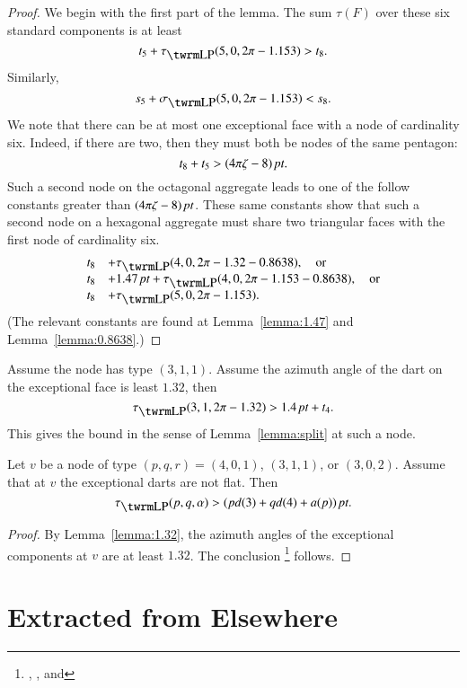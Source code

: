 \begin{proof}
We begin with the first part of the lemma. The sum  $\tau(F)$ over
these six standard components is at least
    $$t_5+\tauLP(5,0,2\pi-1.153)> t_8.$$
Similarly,
    $$s_5+\sLP(5,0,2\pi-1.153)<s_8.$$
%
We note that there can be at most one exceptional face with a node
of cardinality six.  Indeed, if there are two, then they must both
be nodes of the same pentagon:
    $$t_8+t_5>(4\pi\zeta-8)\,\hbox{\it pt}.$$
Such a second node on the octagonal aggregate leads to one of the
follow constants greater than $(4\pi\zeta-8)\,\hbox{\it pt}$.  These same constants
show that such a second node on a hexagonal aggregate must share two
triangular faces with the first node of cardinality six.
$$\begin{array}{lll}
    t_8 &+\tauLP(4,0,2\pi-1.32-0.8638),\quad\text{or}\\
    t_8 &+1.47\,\pt+\tauLP(4,0,2\pi-1.153-0.8638),\quad\text{or}\\
    t_8 &+\tauLP(5,0,2\pi-1.153) .
\end{array}
$$
(The relevant constants are found at Lemma~\ref{lemma:1.47} and
Lemma~\ref{lemma:0.8638}.)
\end{proof}

\begin{lemma}\label{a:311}  %
Assume the node has type $(3,1,1)$.
 Assume the azimuth angle of the dart on the exceptional face is
least $1.32$, then
    \begin{equation}
    \tauLP(3,1,2\pi-1.32)>1.4\,\pt + t_4.
    \label{eqn:tau1.32}
    \end{equation}
This gives the bound in the sense of Lemma~\ref{lemma:split} at such
a node. 
\end{lemma}

\begin{lemma}\label{a:no-ef}  Let $v$ be a node of type
$(p,q,r)=(4,0,1)$, $(3,1,1)$, or $(3,0,2)$.  Assume that at $v$ the
exceptional darts are not flat.  Then
    $$\tauLP(p,q,\alpha) > ( p d(3) + q d(4) + a(p))\,\pt.$$
\end{lemma}

\begin{proof}
By Lemma~\ref{lemma:1.32},
the azimuth angles of the
exceptional components at $v$ are at least $1.32$.   The conclusion%
\footnote{, , and
}
follows.
\end{proof}

\section{Extracted from Elsewhere}


